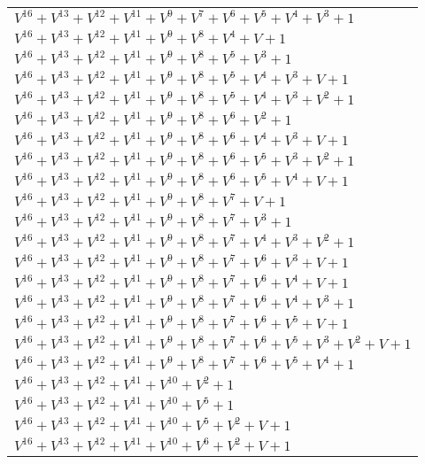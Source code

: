 \documentclass[12pt]{article}
\begin{document}
\begin{adjustwidth}{-4cm}{}
\begin{center}
\begin{longtable}{|l|}
$V^{16}  +V^{13}  +V^{12}  +V^{11}  +V^{9}  +V^{7}  +V^{6}  +V^{5}  +V^{4}  +V^{3}  + 1$ \\
$V^{16}  +V^{13}  +V^{12}  +V^{11}  +V^{9}  +V^{8}  +V^{4}  + V + 1$ \\
$V^{16}  +V^{13}  +V^{12}  +V^{11}  +V^{9}  +V^{8}  +V^{5}  +V^{3}  + 1$ \\
$V^{16}  +V^{13}  +V^{12}  +V^{11}  +V^{9}  +V^{8}  +V^{5}  +V^{4}  +V^{3}  + V + 1$ \\
$V^{16}  +V^{13}  +V^{12}  +V^{11}  +V^{9}  +V^{8}  +V^{5}  +V^{4}  +V^{3}  +V^{2}  + 1$ \\
$V^{16}  +V^{13}  +V^{12}  +V^{11}  +V^{9}  +V^{8}  +V^{6}  +V^{2}  + 1$ \\
$V^{16}  +V^{13}  +V^{12}  +V^{11}  +V^{9}  +V^{8}  +V^{6}  +V^{4}  +V^{3}  + V + 1$ \\
$V^{16}  +V^{13}  +V^{12}  +V^{11}  +V^{9}  +V^{8}  +V^{6}  +V^{5}  +V^{3}  +V^{2}  + 1$ \\
$V^{16}  +V^{13}  +V^{12}  +V^{11}  +V^{9}  +V^{8}  +V^{6}  +V^{5}  +V^{4}  + V + 1$ \\
$V^{16}  +V^{13}  +V^{12}  +V^{11}  +V^{9}  +V^{8}  +V^{7}  + V + 1$ \\
$V^{16}  +V^{13}  +V^{12}  +V^{11}  +V^{9}  +V^{8}  +V^{7}  +V^{3}  + 1$ \\
$V^{16}  +V^{13}  +V^{12}  +V^{11}  +V^{9}  +V^{8}  +V^{7}  +V^{4}  +V^{3}  +V^{2}  + 1$ \\
$V^{16}  +V^{13}  +V^{12}  +V^{11}  +V^{9}  +V^{8}  +V^{7}  +V^{6}  +V^{3}  + V + 1$ \\
$V^{16}  +V^{13}  +V^{12}  +V^{11}  +V^{9}  +V^{8}  +V^{7}  +V^{6}  +V^{4}  + V + 1$ \\
$V^{16}  +V^{13}  +V^{12}  +V^{11}  +V^{9}  +V^{8}  +V^{7}  +V^{6}  +V^{4}  +V^{3}  + 1$ \\
$V^{16}  +V^{13}  +V^{12}  +V^{11}  +V^{9}  +V^{8}  +V^{7}  +V^{6}  +V^{5}  + V + 1$ \\
$V^{16}  +V^{13}  +V^{12}  +V^{11}  +V^{9}  +V^{8}  +V^{7}  +V^{6}  +V^{5}  +V^{3}  +V^{2}  + V + 1$ \\
$V^{16}  +V^{13}  +V^{12}  +V^{11}  +V^{9}  +V^{8}  +V^{7}  +V^{6}  +V^{5}  +V^{4}  + 1$ \\
$V^{16}  +V^{13}  +V^{12}  +V^{11}  +V^{10}  +V^{2}  + 1$ \\
$V^{16}  +V^{13}  +V^{12}  +V^{11}  +V^{10}  +V^{5}  + 1$ \\
$V^{16}  +V^{13}  +V^{12}  +V^{11}  +V^{10}  +V^{5}  +V^{2}  + V + 1$ \\
$V^{16}  +V^{13}  +V^{12}  +V^{11}  +V^{10}  +V^{6}  +V^{2}  + V + 1$ \\

\end{longtable}
\end{center}
\end{adjustwidth}
\end{document}
